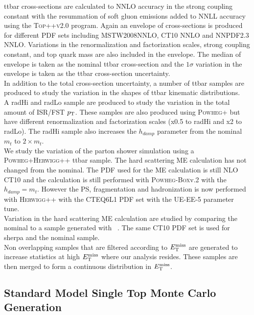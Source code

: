 \indent ttbar cross-sections are calculated to NNLO accuracy in the strong coupling constant with the resummation of soft gluon emissions added to NNLL accuracy using the \textsc{Top++v2.0} program. \cite{topXsec}  Again an envelope of cross-sections is produced for different PDF sets including MSTW2008NNLO, CT10 NNLO and NNPDF2.3 NNLO.  Variations in the renormalization and factorization scales, strong coupling constant, and top quark mass are also included in the envelope.  The median of envelope is taken as the nominal ttbar cross-section and the $1\sigma$ variation in the envelope is taken as the ttbar cross-section uncertainty.  \\

\indent In addition to the total cross-section uncertainty, a number of ttbar samples are produced to study the variation in the shapes of ttbar kinematic distributions. \\
\indent  A radHi and radLo sample are produced to study the variation in the total amount of ISR/FST $p_{\mathrm{T}}$.  These samples are also produced using \textsc{Powheg+} but have different renormalization and factorization scales (x0.5 to radHi and x2 to radLo). The radHi sample also increases the $h_{damp}$ parameter from the nominal $m_{t}$ to $2 \times m_{t}$. \\

\indent We study the variation of the parton shower simulation using a \textsc{Powheg+Herwigg++} ttbar sample. The hard scattering ME calculation has not changed from the nominal.  The PDF used for the ME calculation is still NLO CT10 and the calculation is still performed with \textsc{Powheg-Box}v.2 with the $h_{damp} = m_{t}$.  However the PS, fragmentation and hadronization is now performed with \textsc{Herwigg++} with the CTEQ6L1 PDF set \cite{CTEQ6L1} with the UE-EE-5 parameter tune.\cite{Herwig}  \\

\indent Variation in the hard scattering ME calculation are studied by comparing the nominal to a sample generated with \sherpa~\cite{sherpa}.  The same CT10 PDF set is used for sherpa and the nominal sample. \\ 

\indent Non overlapping samples that are filtered according to $E_{\mathrm{T}}^{\mathrm{miss}}$ are generated to increase statistics at high $E_{\mathrm{T}}^{\mathrm{miss}}$ where our analysis resides.  These samples are then merged to form a  continuous distribution in $E_{\mathrm{T}}^{\mathrm{miss}}$. \\

\subsection{Standard Model Single Top Monte Carlo Generation}

